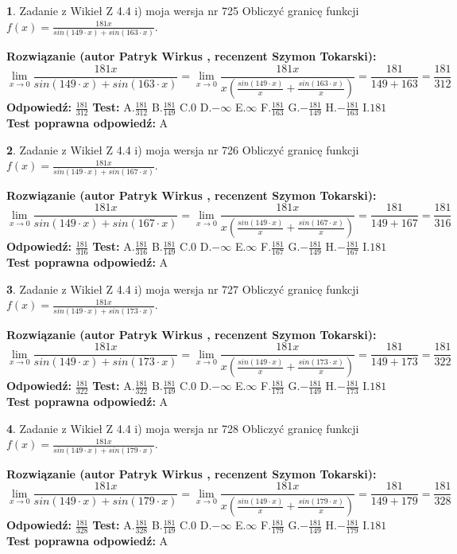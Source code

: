 \documentclass[12pt, a4paper]{article}
\theoremstyle{definition} %
\newtheorem{zad}{}
\newcommand{\zadStart}[1]{\begin{zad}#1\newline}
\newcommand{\zadStop}{\end{zad}}
\newcommand{\rozwStart}[2]{\noindent \textbf{Rozwiązanie (autor #1 , recenzent #2): }\newline}
\newcommand{\rozwStop}{\newline}
\newcommand{\odpStart}{\noindent \textbf{Odpowiedź:}\newline}
\newcommand{\odpStop}{\newline}
\newcommand{\testStart}{\noindent \textbf{Test:}\newline}
\newcommand{\testStop}{\newline}
\newcommand{\kluczStart}{\noindent \textbf{Test poprawna odpowiedź:}\newline}
\newcommand{\kluczStop}{\newline}
\begin{document}
\zadStart{Zadanie z Wikieł Z 4.4 i) moja wersja nr 725}
Obliczyć granicę funkcji $f(x)=\frac{181x}{sin(149\cdot x) +sin(163\cdot x)}$.
\zadStop
\rozwStart{Patryk Wirkus}{Szymon Tokarski}
$$\lim\limits_{x\to 0}\frac{181x}{sin(149\cdot x) +sin(163\cdot x)}=\lim\limits_{x\to 0}\frac{181x}{x(\frac{sin(149\cdot x)}{x}+\frac{sin(163\cdot x)}{x})}=\frac{181}{149+163} = \frac{181}{312}$$
\rozwStop
\odpStart
$\frac{181}{312}$
\odpStop
\testStart
A.$\frac{181}{312}$
B.$\frac{181}{149}$
C.$0$
D.$-\infty$
E.$\infty$
F.$\frac{181}{163}$
G.$-\frac{181}{149}$
H.$-\frac{181}{163}$
I.$181$
\testStop
\kluczStart
A
\kluczStop



\zadStart{Zadanie z Wikieł Z 4.4 i) moja wersja nr 726}
Obliczyć granicę funkcji $f(x)=\frac{181x}{sin(149\cdot x) +sin(167\cdot x)}$.
\zadStop
\rozwStart{Patryk Wirkus}{Szymon Tokarski}
$$\lim\limits_{x\to 0}\frac{181x}{sin(149\cdot x) +sin(167\cdot x)}=\lim\limits_{x\to 0}\frac{181x}{x(\frac{sin(149\cdot x)}{x}+\frac{sin(167\cdot x)}{x})}=\frac{181}{149+167} = \frac{181}{316}$$
\rozwStop
\odpStart
$\frac{181}{316}$
\odpStop
\testStart
A.$\frac{181}{316}$
B.$\frac{181}{149}$
C.$0$
D.$-\infty$
E.$\infty$
F.$\frac{181}{167}$
G.$-\frac{181}{149}$
H.$-\frac{181}{167}$
I.$181$
\testStop
\kluczStart
A
\kluczStop



\zadStart{Zadanie z Wikieł Z 4.4 i) moja wersja nr 727}
Obliczyć granicę funkcji $f(x)=\frac{181x}{sin(149\cdot x) +sin(173\cdot x)}$.
\zadStop
\rozwStart{Patryk Wirkus}{Szymon Tokarski}
$$\lim\limits_{x\to 0}\frac{181x}{sin(149\cdot x) +sin(173\cdot x)}=\lim\limits_{x\to 0}\frac{181x}{x(\frac{sin(149\cdot x)}{x}+\frac{sin(173\cdot x)}{x})}=\frac{181}{149+173} = \frac{181}{322}$$
\rozwStop
\odpStart
$\frac{181}{322}$
\odpStop
\testStart
A.$\frac{181}{322}$
B.$\frac{181}{149}$
C.$0$
D.$-\infty$
E.$\infty$
F.$\frac{181}{173}$
G.$-\frac{181}{149}$
H.$-\frac{181}{173}$
I.$181$
\testStop
\kluczStart
A
\kluczStop



\zadStart{Zadanie z Wikieł Z 4.4 i) moja wersja nr 728}
Obliczyć granicę funkcji $f(x)=\frac{181x}{sin(149\cdot x) +sin(179\cdot x)}$.
\zadStop
\rozwStart{Patryk Wirkus}{Szymon Tokarski}
$$\lim\limits_{x\to 0}\frac{181x}{sin(149\cdot x) +sin(179\cdot x)}=\lim\limits_{x\to 0}\frac{181x}{x(\frac{sin(149\cdot x)}{x}+\frac{sin(179\cdot x)}{x})}=\frac{181}{149+179} = \frac{181}{328}$$
\rozwStop
\odpStart
$\frac{181}{328}$
\odpStop
\testStart
A.$\frac{181}{328}$
B.$\frac{181}{149}$
C.$0$
D.$-\infty$
E.$\infty$
F.$\frac{181}{179}$
G.$-\frac{181}{149}$
H.$-\frac{181}{179}$
I.$181$
\testStop
\kluczStart
A
\kluczStop
\end{document}
